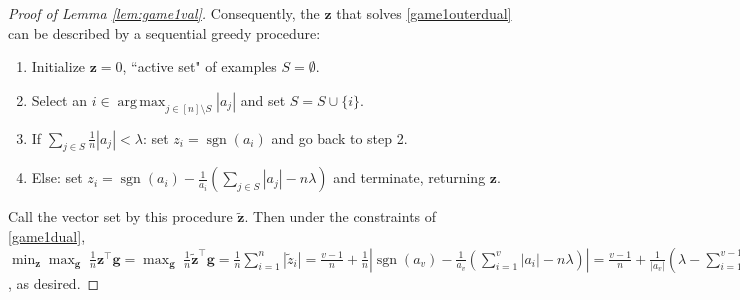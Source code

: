 \documentclass{article}[12pt]
\theoremstyle{named}
\newcommand{\vg}{\mathbf{g}}    %
\newcommand{\vz}{\mathbf{z}}
\DeclareMathOperator*{\argmax}{arg\,max}
\DeclareMathOperator{\sgn}{sgn}
\newcommand{\abs}[1]{\left| #1 \right|}
\newcommand{\lrp}[1]{\left(#1\right)}
\begin{document}
\begin{proof}[Proof of Lemma \ref{lem:game1val}]
Consequently, the $\vz$ that solves \eqref{game1outerdual} can be described by a sequential greedy procedure:
\begin{enumerate}
\item 
Initialize $\vz = 0$, ``active set" of examples $S = \emptyset$.
\item
Select an $i \in \displaystyle \argmax_{j \in [n] \setminus S} \abs{a_j}$ and set $S = S \cup \{ i \}$.
\item
If $\sum_{j \in S} \frac{1}{n} \abs{a_j} < \lambda$: set $z_i = \sgn(a_i)$ and go back to step 2.
\item
Else: set $z_i = \sgn(a_i) - \frac{1}{a_i} \lrp{ \sum_{j \in S} \abs{a_j} - n \lambda}$ and terminate, returning $\vz$.
\end{enumerate}

Call the vector set by this procedure $\tilde{\vz}$. 
Then under the constraints of \eqref{game1dual}, 
$\displaystyle \min_{\vz} \max_{\vg} \; \frac{1}{n} \vz^\top \vg = \max_{\vg} \; \frac{1}{n} \tilde{\vz}^\top \vg 
= \frac{1}{n} \sum_{i=1}^n \abs{\tilde{z}_i} 
= \frac{v-1}{n} + \frac{1}{n} \abs{ \sgn(a_v) - \frac{1}{a_v} \lrp{ \sum_{i=1}^v \abs{a_i} - n \lambda}} 
= \frac{v-1}{n} + \frac{1}{\abs{a_v}} \lrp{ \lambda - \sum_{i=1}^{v-1} \frac{1}{n} \abs{a_i} } = V$
, as desired.
\end{proof}
\end{document}
